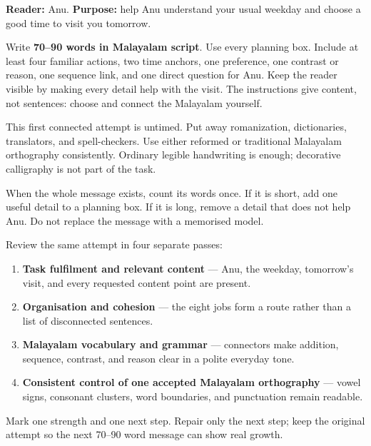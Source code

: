 \textbf{Reader:} Anu. \textbf{Purpose:} help Anu understand your usual weekday and choose a good time to visit you tomorrow.

Write \textbf{70–90 words in Malayalam script}. Use every planning box. Include at least four familiar actions, two time anchors, one preference, one contrast or reason, one sequence link, and one direct question for Anu. Keep the reader visible by making every detail help with the visit. The instructions give content, not sentences: choose and connect the Malayalam yourself.

This first connected attempt is untimed. Put away romanization, dictionaries, translators, and spell-checkers. Use either reformed or traditional Malayalam orthography consistently. Ordinary legible handwriting is enough; decorative calligraphy is not part of the task.

When the whole message exists, count its words once. If it is short, add one useful detail to a planning box. If it is long, remove a detail that does not help Anu. Do not replace the message with a memorised model.

\begin{tcolorbox}[breakable,colback=teal!4,colframe=teal!35!black,title={Before you move on}]
Review the same attempt in four separate passes:

\begin{enumerate}
\raggedright
  \item \textbf{Task fulfilment and relevant content} — Anu, the weekday, tomorrow's visit, and every requested content point are present.
  \item \textbf{Organisation and cohesion} — the eight jobs form a route rather than a list of disconnected sentences.
  \item \textbf{Malayalam vocabulary and grammar} — connectors make addition, sequence, contrast, and reason clear in a polite everyday tone.
  \item \textbf{Consistent control of one accepted Malayalam orthography} — vowel signs, consonant clusters, word boundaries, and punctuation remain readable.
\end{enumerate}

Mark one strength and one next step. Repair only the next step; keep the original attempt so the next 70–90 word message can show real growth.
\end{tcolorbox}
